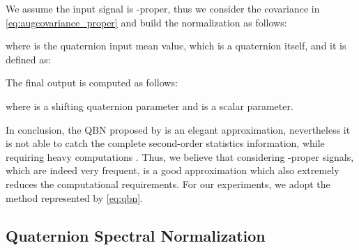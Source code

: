 \documentclass[graybox]{svmult}
\begin{document}
We assume the input signal is -proper, thus we consider the covariance in \eqref{eq:augcovariance_proper} and build the normalization as follows:



\noindent where  is the quaternion input mean value, which is a quaternion itself, and it is defined as:









The final output is computed as follows:



\noindent where  is a shifting quaternion parameter and  is a scalar parameter.












In conclusion, the QBN proposed by \cite{GaudetIJCNN2018} is an elegant approximation, nevertheless it is not able to catch the complete second-order statistics information, while requiring heavy computations \cite{HoffmanAlgebraNets2020}. Thus, we believe that considering -proper signals, which are indeed very frequent, is a good approximation which also extremely reduces the computational requirements. For our experiments, we adopt the method represented by \eqref{eq:qbn}.


\subsection{Quaternion Spectral Normalization}
\label{sec:qsn}
\end{document}
